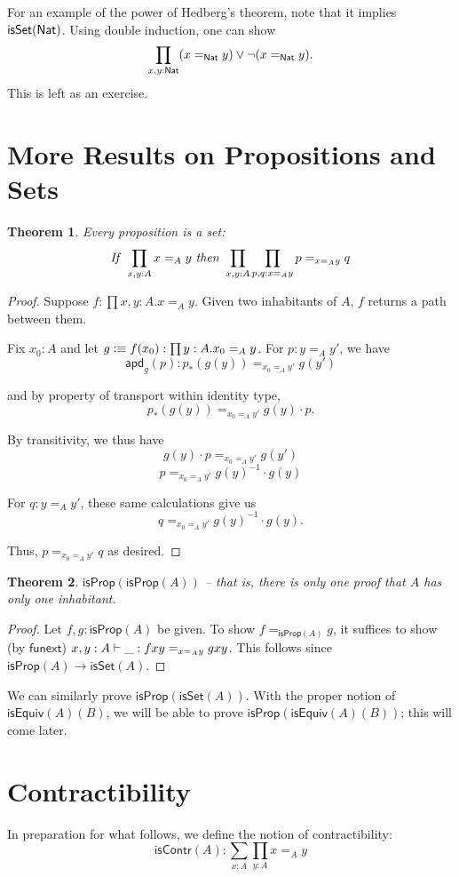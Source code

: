 \documentclass[11pt]{article}
\newcommand*{\apd}{\mathsf{apd}}
\newcommand*{\funext}{\mathsf{funext}}
\newcommand*{\isSet}{\mathsf{isSet}}
\newcommand*{\isProp}{\mathsf{isProp}}
\newcommand*{\isContr}{\mathsf{isContr}}
\newtheorem{thm}{Theorem}
\begin{document}
For an example of the power of Hedberg's theorem, note that it implies $\isSet(\Nat)$.
Using double induction, one can show 
$$\prod_{x,y:\mathsf{Nat}}(x=_{\mathsf{Nat}} y)\vee \neg (x=_{\mathsf{Nat}} y).$$ This is left as an exercise.

\section{More Results on Propositions and Sets}
\begin{thm}
 Every proposition is a set:
 $$\text{\emph{If} }\prod_{x,y:A}x=_A y\text{ \emph{then} }\prod_{x,y:A}\prod_{p,q:x=_A y}p=_{x=_A y} q$$
\end{thm}

\begin{proof}
 Suppose $f:\prod x,y:A.x=_A y$. Given two inhabitants of $A$, $f$ returns a path between them.
 
 Fix $x_0:A$ and let $g \vcentcolon\equiv f(x_0):\prod y:A.x_0=_A y$. For $p:y=_A y'$, we have 
 $$\apd_g(p): p_*(g(y)) =_{x_0=_A y'} g(y')$$
 
 and by property of transport within identity type,
 $$p_*(g(y))=_{x_0=_A y'} g(y)\cdot p.$$
 
 By transitivity, we thus have
 $$g(y)\cdot p =_{x_0=_A y'} g(y')$$
 $$p =_{x_0=_A y'} g(y)^{-1}\cdot g(y)$$
 
 For $q:y=_A y'$, these same calculations give us 
 $$q =_{x_0=_A y'} g(y)^{-1}\cdot g(y).$$
 
 Thus, $p =_{x_0=_A y'} q$ as desired.
\end{proof}

\begin{thm}
 $\isProp(\isProp(A))$ -- that is, there is only one proof that $A$ has only one inhabitant.
\end{thm}
\begin{proof}
 Let $f,g:\isProp(A)$ be given. To show $f =_{\isProp(A)} g$, it suffices to show (by $\funext$)
 $x,y:A\vdash \_: f x y =_{x=_A y} g x y$. This follows since $\isProp(A)\to \isSet(A)$.
\end{proof}

We can similarly prove $\isProp(\isSet(A))$. With the proper notion of $\mathsf{isEquiv}(A)(B)$,
we will be able to prove $\isProp(\mathsf{isEquiv}(A)(B))$; this will come later.


\section{Contractibility}
In preparation for what follows, we define the notion of contractibility:
$$\isContr(A):\sum_{x:A}\prod_{y:A}x=_A y$$
\end{document}
